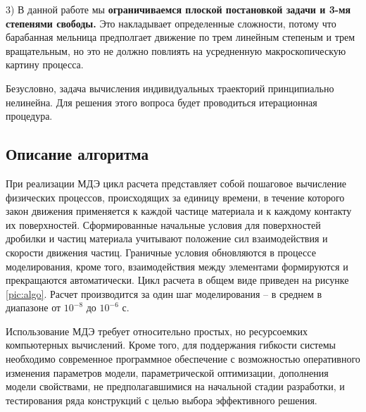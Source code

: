\documentclass[utf8x, 14pt, oneside, a4paper]{article}
\begin{document}
3) В данной работе мы \textbf{ограничиваемся плоской постановкой задачи и 3-мя степенями свободы.} Это накладывает определенные сложности, потому что барабанная мельница предполгает движение по трем линейным степеным и трем вращательным, но это не должно повлиять на усредненную макроскопическую картину процесса.

Безусловно, задача вычисления индивидуальных траекторий принципиально нелинейна.
Для решения этого вопроса будет проводиться итерационная процедура.



\subsection{Описание алгоритма}


При реализации МДЭ цикл расчета представляет собой пошаговое вычисление физических процессов, происходящих за единицу времени, в течение которого закон движения применяется к каждой частице материала и к каждому контакту их поверхностей. 
Сформированные начальные условия для поверхностей дробилки и частиц материала учитывают положение сил взаимодействия и скорости движения частиц. 
Граничные условия обновляются в процессе моделирования, кроме того, взаимодействия между элементами формируются и прекращаются автоматически. 
Цикл расчета в общем виде приведен на рисунке \ref{pic:algo}. Расчет производится за один шаг моделирования -- в среднем в диапазоне от $10^{-8}$ до $10^{-6}$ с.

Использование МДЭ требует относительно простых, но ресурсоемких компьютерных вычислений. 
Кроме того, для поддержания гибкости системы необходимо современное программное обеспечение с возможностью оперативного изменения параметров модели, параметрической оптимизации, дополнения модели свойствами, не предполагавшимися на начальной стадии разработки, и тестирования ряда конструкций с целью выбора эффективного решения. 
\end{document}
